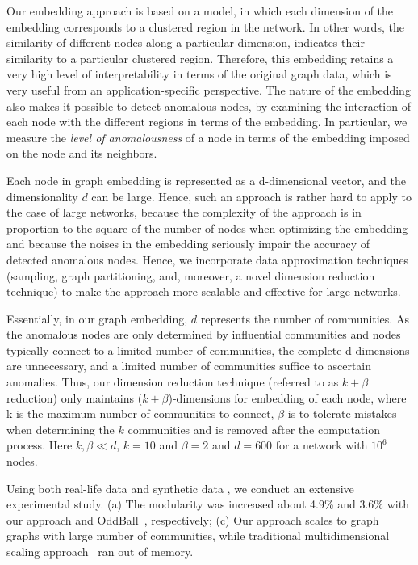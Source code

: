 Our embedding approach is  based on a model, in which each dimension of the embedding corresponds to a clustered region in the network.
In other words, the similarity of different nodes along a particular dimension, indicates their similarity to a particular clustered region.
Therefore, this embedding retains a very high level of interpretability in  terms of the original graph data, which is very useful from an application-specific perspective. The nature of  the embedding also  makes it  possible  to detect anomalous nodes, by examining the interaction of each node with the different regions in terms of the embedding. In particular, we measure the {\em level of anomalousness} of a node in terms of the embedding imposed on the node and its neighbors.


Each node in graph embedding is represented as a d-dimensional vector, and the dimensionality $d$ can be large. Hence, such an approach is rather hard to apply to the case of large networks, because the complexity of the approach is in proportion to the square of the number of nodes when optimizing the embedding and because the noises in the embedding seriously impair the accuracy of detected anomalous nodes. Hence, we incorporate data approximation techniques (sampling, graph partitioning, and, moreover, a novel dimension reduction technique) to make the approach more scalable and effective for large networks.

Essentially, in our graph embedding, $d$ represents the number of communities. As the anomalous nodes are only determined by influential communities and nodes typically connect to a limited number of communities, the complete d-dimensions are unnecessary, and a limited number of communities suffice to ascertain anomalies. Thus, our dimension reduction technique (referred to as $k+\beta$ reduction) only maintains ($k + \beta$)-dimensions for embedding of each node, where k is the maximum number of communities to connect, $\beta$ is to tolerate mistakes when determining the $k$ communities and is removed after the computation process. Here $k, \beta \ll d$, \eg $k = 10$ and $\beta = 2$ and $d=600$ for a network with $10^6$ nodes.



Using both real-life data and synthetic
data , we conduct an extensive experimental study.
 (a) The modularity \cite{newman1} was increased about 4.9\% and 3.6\% with our approach and OddBall~\cite{akoglu14}, respectively; (c) Our approach scales to graph graphs with large number of communities, while traditional  multidimensional scaling approach~\cite{mds} ran out of memory.


